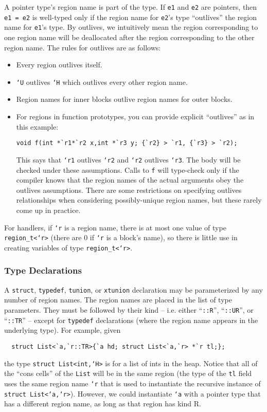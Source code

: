 A pointer type's region name is part of the type.  If \texttt{e1} and
\texttt{e2} are pointers, then \texttt{e1 = e2} is well-typed only if
the region name for \texttt{e2}'s type ``outlives'' the region name
for \texttt{e1}'s type.  By outlives, we intuitively mean the region
corresponding to one region name will be deallocated after the region
corresponding to the other region name.  The rules for outlives are as
follows:
\begin{itemize}
\item Every region outlives itself.
\item \texttt{`U} outlives \texttt{`H} which outlives every other region
name.
\item Region names for inner blocks outlive region names for outer
blocks.
\item For regions in function prototypes, you can provide explicit
``outlives'' as in this example:
\begin{verbatim}
void f(int *`r1*`r2 x,int *`r3 y; {`r2} > `r1, {`r3} > `r2);
\end{verbatim}
This says that \texttt{`r1} outlives \texttt{`r2} and \texttt{`r2}
outlives \texttt{`r3}.  The body will be checked under these
assumptions.  Calls to \texttt{f} will type-check only if the compiler
knows that the region names of the actual arguments obey the outlives
assumptions.  There are some restrictions on specifying outlives
relationships when considering possibly-unique region names, but these
rarely come up in practice.
\end{itemize}

For handlers, if \texttt{`r} is a region name, there is at most one
value of type \texttt{region_t<`r>} (there are 0 if \texttt{`r} is a
block's name), so there is little use in creating variables of type
\texttt{region_t<`r>}.

\subsubsection{Type Declarations}

A \texttt{struct}, \texttt{typedef}, \texttt{tunion}, or \texttt{xtunion}
declaration may be parameterized by any number of region names.  The region
names are placed in the list of type parameters.  They must be followed by
their kind -- i.e. either ``\texttt{::R}'', ``\texttt{::UR}'', or
``\texttt{::TR}'' -- except for \texttt{typedef} declarations (where the
region name appears in the underlying type).  For example, given
\begin{verbatim}
  struct List<`a,`r::TR>{`a hd; struct List<`a,`r> *`r tl;};
\end{verbatim}
the type \texttt{struct List<int,`H>} is for a list of ints in the heap.
Notice that all of the ``cons cells'' of the \texttt{List} will be in
the same region (the type of the \texttt{tl} field uses the same
region name \texttt{`r} that is used to instantiate the recursive
instance of \texttt{struct List<`a,`r>}).  However, we could instantiate
\texttt{`a} with a pointer type that has a different region name, as long as
that region has kind R.

